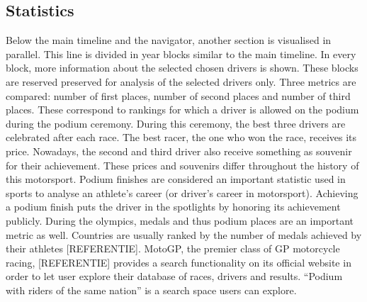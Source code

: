 \documentclass{sigchi}
\begin{document}
\subsection{Statistics}

Below the main timeline and the navigator, another section is visualised in parallel. This line is divided in year blocks similar to the main timeline. In every block, more information about the selected chosen drivers is shown. These blocks are reserved preserved for analysis of the selected drivers only. Three metrics are compared: number of first places, number of second places and number of third places. These correspond to rankings for which a driver is allowed on the podium during the podium ceremony. During this ceremony, the best three drivers are celebrated after each race. The best racer, the one who won the race, receives its price. Nowadays, the second and third driver also receive something as souvenir for their achievement. These prices and souvenirs differ throughout the history of this motorsport.  Podium finishes are considered an important statistic used in sports to analyse an athlete's career (or driver's career in motorsport). Achieving a podium finish puts the driver in the spotlights by honoring its achievement publicly. During the olympics, medals and thus podium places are an important metric as well. Countries are usually ranked by the number of medals achieved by their athletes [REFERENTIE]. MotoGP, the premier class of GP motorcycle racing, [REFERENTIE] provides a search functionality on its official website in order to let user explore their database of races, drivers and results. ``Podium with riders of the same nation'' is a search space users can explore.
\end{document}
